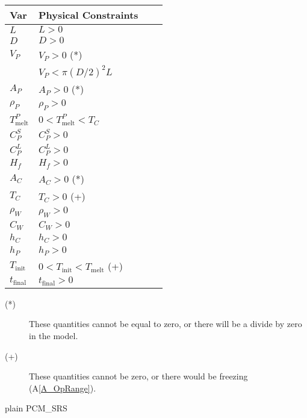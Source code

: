 \documentclass[12pt]{article}
\newcommand{\aref}[1]{A\ref{#1}}
\begin{document}
\newpage

\begin{table}[!h]
\caption{Data Constraints on Input} \label{TblInputVar}
\renewcommand{\arraystretch}{1.2}
\noindent \begin{longtable}{l l l c} 
  \toprule
  \textbf{Var} & \textbf{Physical Constraints} \\
  \midrule 
  $L$	& $L > 0$		
  \\
  $D$	& $D > 0$		
  \\
  $V_P$ & $V_P > 0$ (*)	
  \\
   & $V_P < \pi (D/2)^2 L$
  \\
  $A_P$ & $A_P > 0$ (*)	
  \\
  $\rho_P$ & $\rho_P > 0$	
  \\
  $T_\text{melt}^{P}$ 	& $0 < T_\text{melt}^{P} < T_C$
  \\
  $C_P^S$ & $C_P^S > 0$ 
  \\
  $C_P^L$ & $C_P^L > 0$ 
  \\
  $H_f$ & $H_f > 0$ 
  \\
  $A_C$ & $A_C > 0$ (*)	
  \\
  $T_C$ & $T_C > 0$ (+)	
  \\
  $\rho_W$ & $\rho_W > 0$	
  \\
  $C_W$ & $C_W > 0$	
  \\
  $h_C$ & $h_C > 0$	
  \\
  $h_P$ & $h_P > 0$	
  \\
  $T_\text{init}$ & $0 < T_\text{init} < T_\text{melt} $ (+) 
  \\
  $t_\text{final}$ & $t_\text{final} > 0$ 
  \\
  \bottomrule
\end{longtable}
\end{table}

\noindent \begin{description}
\item[(*)] These quantities cannot be equal to zero, or there will be a divide by
  zero in the model.
\item[(+)] These quantities cannot be zero, or there would be freezing (\aref{A_OpRange}).
\end{description}

 {plain}
 {PCM_SRS}
\end{document}
